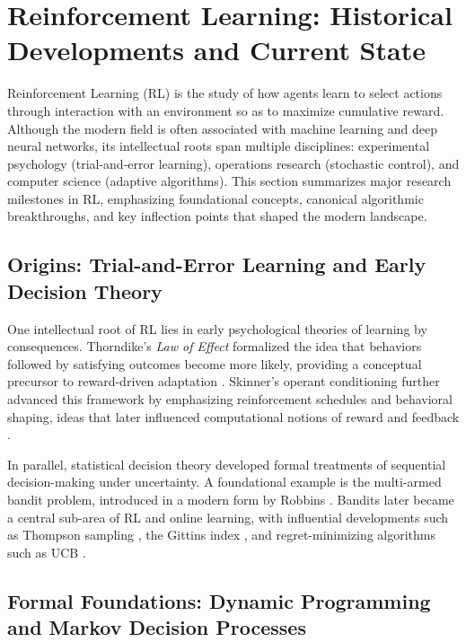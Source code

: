 \documentclass[unnumsec,webpdf,contemporary,large]{oup-authoring-template}
\theoremstyle{thmstyleone}
\theoremstyle{thmstyletwo}
\theoremstyle{thmstylethree}
\begin{document}

\section{Reinforcement Learning: Historical Developments and Current State}
\label{sec:rl-history}

Reinforcement Learning (RL) is the study of how agents learn to select actions through interaction with an environment so as to maximize cumulative reward.
Although the modern field is often associated with machine learning and deep neural networks, its intellectual roots span multiple disciplines: experimental psychology (trial-and-error learning), operations research (stochastic control), and computer science (adaptive algorithms).
This section summarizes major research milestones in RL, emphasizing foundational concepts, canonical algorithmic breakthroughs, and key inflection points that shaped the modern landscape.

\subsection{Origins: Trial-and-Error Learning and Early Decision Theory}

One intellectual root of RL lies in early psychological theories of learning by consequences.
Thorndike's \emph{Law of Effect} formalized the idea that behaviors followed by satisfying outcomes become more likely, providing a conceptual precursor to reward-driven adaptation \cite{thorndike1898animal}.
Skinner's operant conditioning further advanced this framework by emphasizing reinforcement schedules and behavioral shaping, ideas that later influenced computational notions of reward and feedback \cite{skinner1938behavior}.

In parallel, statistical decision theory developed formal treatments of sequential decision-making under uncertainty.
A foundational example is the multi-armed bandit problem, introduced in a modern form by Robbins \cite{robbins1952sequential}.
Bandits later became a central sub-area of RL and online learning, with influential developments such as Thompson sampling \cite{thompson1933likelihood},
the Gittins index \cite{gittins1979bandit},
and regret-minimizing algorithms such as UCB \cite{auer2002finite}.

\subsection{Formal Foundations: Dynamic Programming and Markov Decision Processes}
\end{document}
